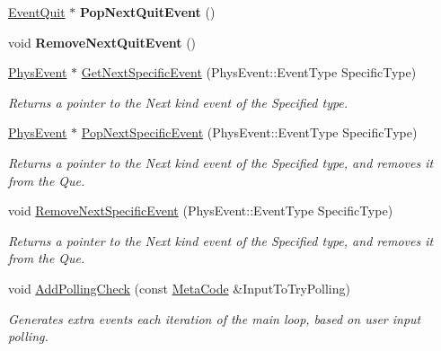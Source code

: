 \begin{DoxyCompactItemize}
\item 
\hypertarget{classPhysEventManager_a1def6dcacc5dd8a0d55dd2d47fe89a1c}{
\hyperlink{classEventQuit}{EventQuit} $\ast$ {\bfseries PopNextQuitEvent} ()}
\label{d5/dd7/classPhysEventManager_a1def6dcacc5dd8a0d55dd2d47fe89a1c}

\item 
\hypertarget{classPhysEventManager_accdd3b4047b05b721f77ca68e016baf5}{
void {\bfseries RemoveNextQuitEvent} ()}
\label{d5/dd7/classPhysEventManager_accdd3b4047b05b721f77ca68e016baf5}

\item 
\hyperlink{classPhysEvent}{PhysEvent} $\ast$ \hyperlink{classPhysEventManager_a56e45572c2fb84131f7d55c060c7ac21}{GetNextSpecificEvent} (PhysEvent::EventType SpecificType)
\begin{DoxyCompactList}\small\item\em Returns a pointer to the Next kind event of the Specified type. \item\end{DoxyCompactList}\item 
\hyperlink{classPhysEvent}{PhysEvent} $\ast$ \hyperlink{classPhysEventManager_abce156f7ad7ab145b8b05740b48e6073}{PopNextSpecificEvent} (PhysEvent::EventType SpecificType)
\begin{DoxyCompactList}\small\item\em Returns a pointer to the Next kind event of the Specified type, and removes it from the Que. \item\end{DoxyCompactList}\item 
void \hyperlink{classPhysEventManager_a2d0c21e369d16cd2de97eb4c69003323}{RemoveNextSpecificEvent} (PhysEvent::EventType SpecificType)
\begin{DoxyCompactList}\small\item\em Returns a pointer to the Next kind event of the Specified type, and removes it from the Que. \item\end{DoxyCompactList}\item 
void \hyperlink{classPhysEventManager_a1e99385441c5377a741561db581ef3ae}{AddPollingCheck} (const \hyperlink{classMetaCode}{MetaCode} \&InputToTryPolling)
\begin{DoxyCompactList}\small\item\em Generates extra events each iteration of the main loop, based on user input polling. \item\end{DoxyCompactList}\item 

\end{DoxyCompactItemize}
